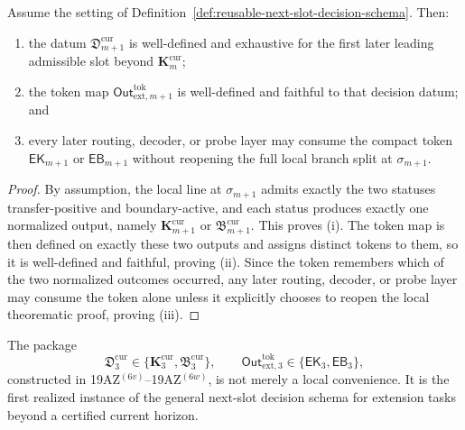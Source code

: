 \begin{proposition}
\label{prop:any-normalized-first-slot-extension-stage-collapses-to-one-finite-decision-datum-and-one-faithful-token}
Assume the setting of Definition~\ref{def:reusable-next-slot-decision-schema}. Then:
\begin{enumerate}[label=(\roman*)]
 \item the datum $\mathfrak D_{m+1}^{\mathrm{cur}}$ is well-defined and exhaustive for the first later leading admissible slot beyond $\mathbf K_m^{\mathrm{cur}}$;
 \item the token map $\mathsf{Out}^{\mathrm{tok}}_{\mathrm{ext},m+1}$ is well-defined and faithful to that decision datum; and
 \item every later routing, decoder, or probe layer may consume the compact token $\mathsf{EK}_{m+1}$ or $\mathsf{EB}_{m+1}$ without reopening the full local branch split at $\sigma_{m+1}$.
\end{enumerate}
\end{proposition}

\begin{proof}
By assumption, the local line at $\sigma_{m+1}$ admits exactly the two statuses transfer-positive and boundary-active, and each status produces exactly one normalized output, namely $\mathbf K_{m+1}^{\mathrm{cur}}$ or $\mathfrak B_{m+1}^{\mathrm{cur}}$. This proves (i). The token map is then defined on exactly these two outputs and assigns distinct tokens to them, so it is well-defined and faithful, proving (ii). Since the token remembers which of the two normalized outcomes occurred, any later routing, decoder, or probe layer may consume the token alone unless it explicitly chooses to reopen the local theorematic proof, proving (iii).
\end{proof}

\begin{corollary}
\label{cor:sigma3-decision-package-is-the-first-realized-instance-of-reusable-extension-schema}
The package
\[
 \mathfrak D_3^{\mathrm{cur}}
 \in
 \{\mathbf K_3^{\mathrm{cur}},\mathfrak B_3^{\mathrm{cur}}\},
 \qquad
 \mathsf{Out}^{\mathrm{tok}}_{\mathrm{ext},3}
 \in
 \{\mathsf{EK}_3,\mathsf{EB}_3\},
\]
constructed in 19AZ$^{(6v)}$--19AZ$^{(6w)}$, is not merely a local convenience. It is the first realized instance of the general next-slot decision schema for extension tasks beyond a certified current horizon.
\end{corollary}


